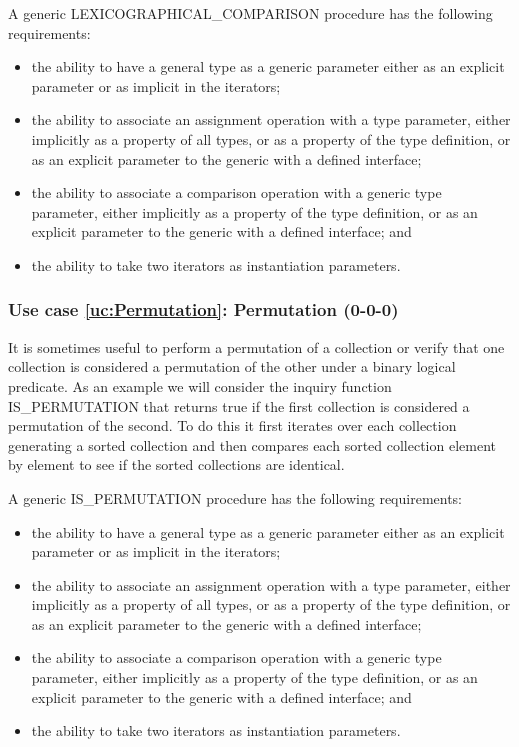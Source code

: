 \documentclass{article}
\newcounter{usecase}
\newcounter{requirement}
\newcommand{\newusecase}[2]{
\refstepcounter{usecase}\label{uc:#1}
\subsubsection{Use case \ref{uc:#1}: #1 (#2)}}
\begin{document}
A generic {\rm LEXICOGRAPHICAL\_COMPARISON} procedure has the
following requirements:
\begin{itemize}
\item the ability to have a general type as a generic parameter
  either as an explicit parameter or as implicit in the iterators;

\item the ability to associate an assignment operation with a type
  parameter, either implicitly as a property of all types, or
  as a property of the type definition, or as an explicit parameter to
  the generic with a defined interface;

\item the ability to associate a comparison operation with a
  generic type parameter, either implicitly
  as a property of the type definition, or as an explicit parameter to
  the generic with a defined interface; and

\item the ability to take two iterators as instantiation
  parameters.

\end{itemize}

\newusecase{Permutation}{0-0-0}
It is sometimes useful to perform a permutation of a collection or
verify that one collection is considered a permutation of the other
under a binary logical predicate.  As an example we will consider the
inquiry function {\rm IS\_PERMUTATION} that returns true if the first
collection is considered a permutation of the second. To do this it
first iterates over each collection generating a sorted collection and
then compares each sorted collection element by element to see if the
sorted collections are identical.

A generic {\rm IS\_PERMUTATION} procedure has the
following requirements:
\begin{itemize}
\item the ability to have a general type as a generic parameter
  either as an explicit parameter or as implicit in the iterators;

\item the ability to associate an assignment operation with a type
  parameter, either implicitly as a property of all types, or
  as a property of the type definition, or as an explicit parameter to
  the generic with a defined interface;

\item the ability to associate a comparison operation with a
  generic type parameter, either implicitly
  as a property of the type definition, or as an explicit parameter to
  the generic with a defined interface; and

\item the ability to take two iterators as instantiation
  parameters.

\end{itemize}
\end{document}
